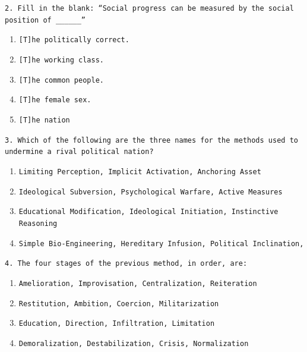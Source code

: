 \documentclass[11pt]{scrartcl} %
\begin{document}
\texttt{2. Fill in the blank: ``Social progress can be measured by the social position of \_\_\_\_\_\_''}

\begin{enumerate}[label=\texttt{\textbf{\alph*)}}]
\item \texttt{[T]he politically correct.}
\item \texttt{[T]he working class.}
\item \texttt{[T]he common people.}
\item \texttt{[T]he female sex.}
\item \texttt{[T]he nation}
\end{enumerate}


\newpage

\texttt{3. Which of the following are the three names for the methods used to undermine a rival political nation?}

\begin{enumerate}[label=\texttt{\textbf{\alph*)}}]
\item \texttt{Limiting Perception, Implicit Activation, Anchoring Asset}
\item \texttt{Ideological Subversion, Psychological Warfare, Active Measures}
\item \texttt{Educational Modification, Ideological Initiation, Instinctive Reasoning}
\item \texttt{Simple Bio-Engineering, Hereditary Infusion, Political Inclination,}
\end{enumerate}



\texttt{4. The four stages of the previous method, in order, are:}

\begin{enumerate}[label=\texttt{\textbf{\alph*)}}]
\item \texttt{Amelioration, Improvisation, Centralization, Reiteration}
\item \texttt{Restitution, Ambition, Coercion, Militarization}
\item \texttt{Education, Direction, Infiltration, Limitation}
\item \texttt{Demoralization, Destabilization, Crisis, Normalization}
\end{enumerate}

\end{document}
